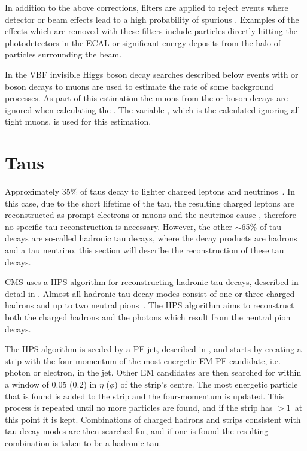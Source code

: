 In addition to the above corrections, filters are applied to reject events where detector or beam effects lead to a high probability of spurious \MET. Examples of the effects which are removed with these filters include particles directly hitting the photodetectors in the \ac{ECAL} or significant energy deposits from the halo of particles surrounding the \LHC beam.

In the \ac{VBF} invisible Higgs boson decay searches described below events with \PW or \PZ boson decays to muons are used to estimate the rate of some background processes. As part of this estimation the muons from the \PW or \PZ boson decays are ignored when calculating the \MET. The variable \METnoMU, which is the \MET calculated ignoring all tight muons, is used for this estimation.
\section{Taus}
\label{sec:taus}
Approximately 35\% of taus decay to lighter charged leptons and neutrinos~\cite{pdg}. In this case, due to the short lifetime of the tau, the resulting charged leptons are reconstructed as prompt electrons or muons and the neutrinos cause \MET, therefore no specific tau reconstruction is necessary. However, the other $\sim$65\% of tau decays are so-called hadronic tau decays, where the decay products are hadrons and a tau neutrino. this section will describe the reconstruction of these tau decays.

CMS uses a \ac{HPS} algorithm for reconstructing hadronic tau decays, described in detail in . Almost all hadronic tau decay modes consist of one or three charged hadrons and up to two neutral pions~\cite{pdg}. The \ac{HPS} algorithm aims to reconstruct both the charged hadrons and the photons which result from the neutral pion decays.

The \ac{HPS} algorithm is seeded by a \ac{PF} jet, described in , and starts by creating a strip with the four-momentum of the most energetic \ac{EM} \ac{PF} candidate, i.e. photon or electron, in the jet. Other \ac{EM} candidates are then searched for within  a window of 0.05 (0.2) in $\eta$ ($\phi$) of the strip's centre. The most energetic particle that is found is added to the strip and the four-momentum is updated. This process is repeated until no more particles are found, and if the strip has \pt$>1$\GeV\, at this point it is kept. Combinations of charged hadrons and strips consistent with tau decay modes are then searched for, and if one is found the resulting combination is taken to be a hadronic tau.

